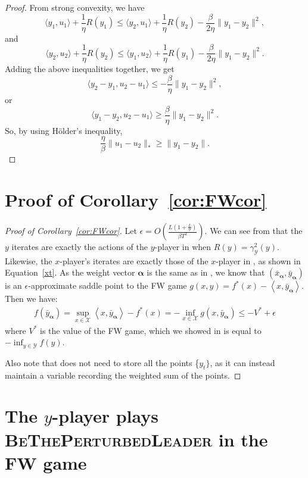 \documentclass[pmlr]{jmlr} %
\def\balpha{\boldsymbol{\alpha}}
\def\BTPL{\textsc{BeThePerturbedLeader}\xspace}
\newcommand{\lr}[2]{\left\langle#1,#2\right\rangle}
\newcommand{\XX}{\mathcal{X}}
\newcommand{\YY}{\mathcal{Y}}
\newcommand{\pr}[1]{\left(#1\right)}
\begin{document}
\begin{proof}
From strong convexity, we have
\[ \langle y_{1}, u_{1} \rangle + \frac{1}{\eta} R(y_{1})
\leq \langle y_{2}, u_{1} \rangle + \frac{1}{\eta} R(y_{2}) - \frac{\beta}{2 \eta} \| y_{1} - y_{2}\|^{2},\]
and
\[ \langle y_{2}, u_{2} \rangle + \frac{1}{\eta} R(y_{2})
\leq \langle y_{1}, u_{2} \rangle + \frac{1}{\eta} R(y_{1}) - \frac{\beta}{2 \eta} \| y_{1} - y_{2}\|^{2}.\]
Adding the above inequalities together,
we get 
\[\langle y_{2} - y_{1}, u_{2} - u_{1} \rangle \leq - \frac{\beta}{\eta} \| y_{1} - y_{2}\|^{2},\] 
or
\[\langle y_{1} - y_{2}, u_{2} - u_{1} \rangle \geq \frac{\beta}{\eta} \| y_{1} - y_{2}\|^{2}.\]
So, by using H\"older's inequality,
\[  \frac{\eta}{\beta} \|  u_{1} - u_{2}\|_{*} \geq \| y_{1} - y_{2} \|.\]
\end{proof}

\section{Proof of Corollary~\ref{cor:FWcor}}\label{app:fwcor}
\begin{proof}[Proof of Corollary~\ref{cor:FWcor}]
	Let $\epsilon = O\pr{ \frac{ L(1+\frac{L}{\sigma}) }{\beta  T^{2}}}$. We can see from  that the $y$ iterates are exactly the actions of the $y$-player in  when $R(y) = \gamma_{\YY}^{2}(y)$. Likewise, the $x$-player's iterates are exactly those of the $x$-player in , as shown in Equation~\ref{xt}. As the weight vector $\balpha$ is the same as in , we know that $(\bar{x}_{\balpha},\bar{y}_{\balpha})$ is an $\epsilon$-approximate saddle point to the FW game $g(x,y) = f^{*}(x) - \lr{x}{\bar{y}_{\balpha}}$. Then we have:
	\begin{align*}
	f(\bar{y}_{\balpha}) = \sup_{x\in \XX} \lr{x}{\bar{y}_{\balpha}} - f^{*}(x) = -\inf_{x\in\XX} g(x,\bar{y}_{\balpha}) \le -V^{*} + \epsilon 
	\end{align*}
	where $V^{*}$ is the value of the FW game, which we showed in  is equal to $-\inf_{y\in \YY} f(y)$.
	
	Also note that  does not need to store all the points \{$y_{t}\}$, as it can instead maintain a variable recording the weighted sum of the points.	
\end{proof}



\section{The $y$-player plays \BTPL in the FW game} \label{app:BTPL}
\end{document}

